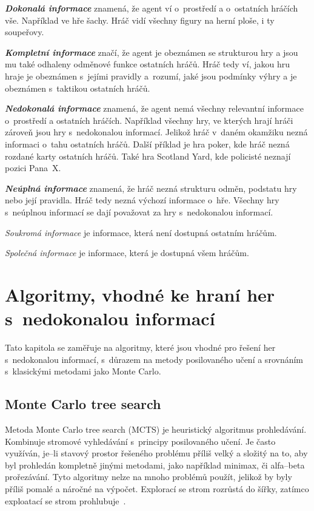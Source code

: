 \textbf{\emph{Dokonalá informace}} znamená, že agent ví o~prostředí a o~ostatních hráčích vše.
Například ve hře šachy.
Hráč vidí všechny figury na herní ploše, i ty soupeřovy.

\textbf{\emph{Kompletní informace}} značí, že agent je obeznámen se strukturou hry a jsou mu také odhaleny odměnové funkce ostatních hráčů.
Hráč tedy ví, jakou hru hraje je obeznámen s~jejími pravidly a~rozumí, jaké jsou podmínky výhry a je obeznámen s~taktikou ostatních hráčů.

\textbf{\emph{Nedokonalá informace}} znamená, že agent nemá všechny relevantní informace o~prostředí a ostatních hráčích.
Například všechny hry, ve kterých hrají hráči zároveň jsou hry s~nedokonalou informací.
Jelikož hráč v~daném okamžiku nezná informaci o~tahu ostatních hráčů.
Další příklad je hra poker, kde hráč nezná rozdané karty ostatních hráčů.
Také hra Scotland Yard, kde policisté neznají pozici Pana~X\@.

\textbf{\emph{Neúplná informace}} znamená, že hráč nezná strukturu odměn, podstatu hry nebo její pravidla.
Hráč tedy nezná výchozí informace o~hře.
Všechny hry s~neúplnou informací se dají považovat za hry s~nedokonalou informací.
\bigskip

\emph{Soukromá informace} je informace, která není dostupná ostatním hráčům.

\emph{Společná informace} je informace, která je dostupná všem hráčům.

\chapter{Algoritmy, vhodné ke hraní her s~nedokonalou informací}\label{sec:vhodne-algoritmy-k-reseni-her-s-nedokonalou-informaci}

Tato kapitola se zaměřuje na algoritmy, které jsou vhodné pro řešení her s~nedokonalou informací, s~důrazem na metody posilovaného učení a srovnáním s~klasickými metodami jako Monte Carlo.

\section{Monte Carlo tree search}\label{subsec:monte-carlo-tree-search}
Metoda Monte Carlo tree search (MCTS) je heuristický algoritmus prohledávání.
Kombinuje stromové vyhledávání s~principy posilovaného učení.
Je často využíván, je--li stavový prostor řešeného problému příliš velký a složitý na to, aby byl prohledán kompletně jinými metodami, jako například minimax, či alfa--beta prořezávání.
Tyto  algoritmy nelze na mnoho problémů použít, jelikož by byly příliš pomalé a náročné na výpočet.
Explorací se strom rozrůstá do šířky, zatímco exploatací se strom prohlubuje~\cite{mcts_geeksforgeeks}.

